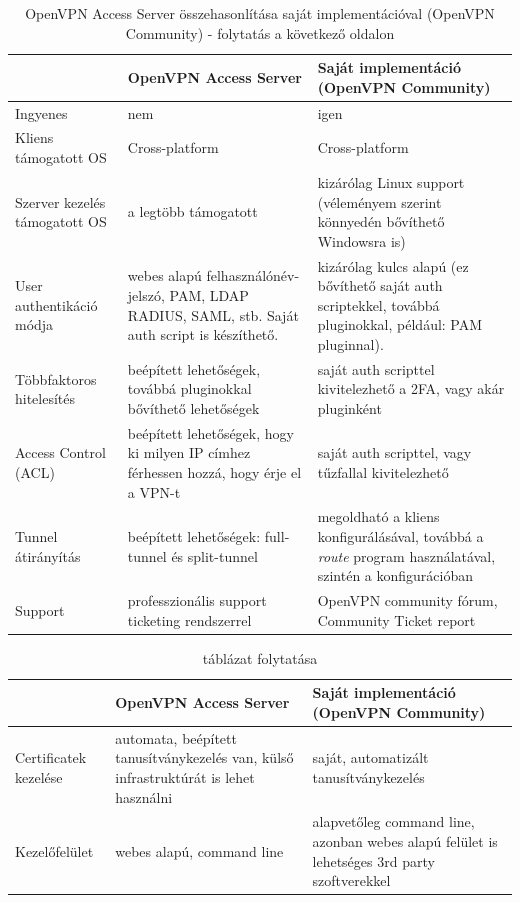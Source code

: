 \begin{table}[h]
\centering
\caption{OpenVPN Access Server \cite{openvpnaccessserver} összehasonlítása saját implementációval (OpenVPN Community) - folytatás a következő oldalon}
\label{tab:openvpn_apps}
\begin{tabularx}{\linewidth}{l|L|L}
 & OpenVPN Access Server & Saját implementáció (OpenVPN Community) \\
\hline
Ingyenes & nem & igen \\
\hline
Kliens támogatott OS & Cross-platform & Cross-platform \\
\hline
Szerver kezelés támogatott OS & a legtöbb támogatott & kizárólag Linux support (véleményem szerint könnyedén bővíthető Windowsra is) \\
\hline
User authentikáció módja & webes alapú felhasználónév-jelszó, PAM, LDAP \newline RADIUS, SAML, stb. Saját auth script is készíthető. & kizárólag kulcs alapú (ez bővíthető saját auth scriptekkel, továbbá pluginokkal, például: PAM pluginnal). \\
\hline
Többfaktoros hitelesítés & beépített lehetőségek, továbbá pluginokkal bővíthető lehetőségek & saját auth scripttel kivitelezhető a 2FA, vagy akár pluginként \\
\hline
Access Control (ACL) & beépített lehetőségek, hogy ki milyen IP címhez férhessen hozzá, hogy érje el a VPN-t & saját auth scripttel, vagy tűzfallal kivitelezhető \\
\hline
Tunnel átirányítás & beépített lehetőségek: full-tunnel és split-tunnel & megoldható a kliens konfigurálásával, továbbá a \textit{route} program használatával, szintén a konfigurációban \\
\hline
Support & professzionális support ticketing rendszerrel & OpenVPN community fórum, Community Ticket report \\
\end{tabularx}
\end{table}

\begin{table}[h]
\centering
\caption{ táblázat folytatása}
\begin{tabularx}{\linewidth}{l|L|L}
 & OpenVPN Access Server & Saját implementáció (OpenVPN Community) \\
\hline
Certificatek kezelése & automata, beépített tanusítványkezelés van, külső infrastruktúrát is lehet használni & saját, automatizált tanusítványkezelés \\
\hline
Kezelőfelület & webes alapú, command line & alapvetőleg command line, azonban webes alapú felület is lehetséges 3rd party szoftverekkel
\end{tabularx}
\end{table}
\pagebreak
 
